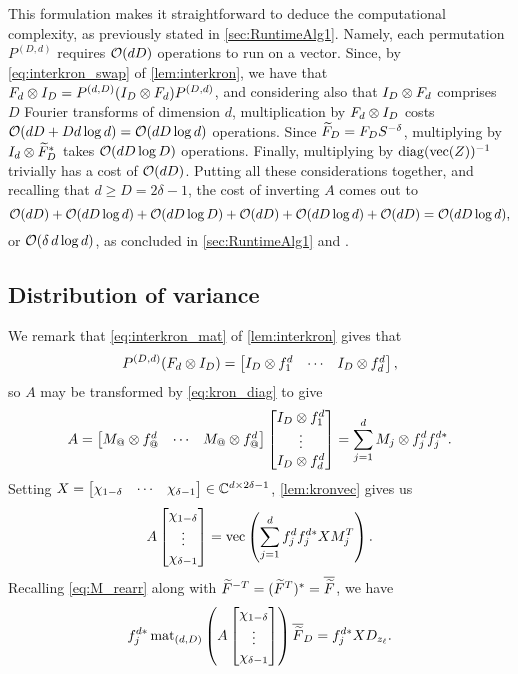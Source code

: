 This formulation makes it straightforward to deduce the computational complexity, as previously stated in \cref{sec:RuntimeAlg1}.  Namely, each permutation $P^{(D, d)}$ requires $\mathcal{O}(d D)$ operations to run on a vector.  Since, by \eqref{eq:interkron_swap} of \cref{lem:interkron}, we have that $F_d \otimes I_D = P^{(d, D)}(I_D \otimes F_d) P^{(D, d)}$, and considering also that $I_D \otimes F_d$ comprises $D$ Fourier transforms of dimension $d$, multiplication by $F_d \otimes I_D$ costs $\mathcal{O}(d D + D d \log d) = \mathcal{O}(d D \log d)$ operations.  Since $\widetilde{F}_D = F_D S^{-\delta}$, multiplying by $I_d \otimes \widetilde{F}_D^*$ takes $\mathcal{O}(d D \log D)$ operations.  Finally, multiplying by $\operatorname{diag}(\operatorname{vec}(Z))^{-1}$ trivially has a cost of $\mathcal{O}(d D)$.  Putting all these considerations together, and recalling that $d \ge D = 2 \delta - 1$, the cost of inverting $A$ comes out to \[\mathcal{O}(d D) + \mathcal{O}(d D \log d) + \mathcal{O}(d D \log D) + \mathcal{O}(d D) + \mathcal{O}(d D \log d) + \mathcal{O}(d D) = \mathcal{O}(d D \log d),\] or $\mathcal{O}(\delta\, d \log d)$, as concluded in \cref{sec:RuntimeAlg1} and \cite{IVW2015_FastPhase}.

\subsection{Distribution of variance}
We remark that \eqref{eq:interkron_mat} of \cref{lem:interkron} gives that \[P^{(D, d)} (F_d \otimes I_D) = \begin{bmatrix} I_D \otimes f^d_{1} & \cdots & I_D \otimes f^d_{d} \end{bmatrix},\] so $A$ may be transformed by \eqref{eq:kron_diag} to give \[A = \rowmatfun{M_@ \kron f_@^d}{1}{d} \colmat{I_D \kron f^d}{1}{d} = \sum_{j = 1}^d M_j \kron f_j^d f_j^{d*}.\]  Setting $X = \begin{bmatrix} \chi_{1 - \delta} & \cdots & \chi_{\delta - 1} \end{bmatrix} \in \mathbb{C}^{d \times 2 \delta - 1}$, \cref{lem:kronvec} gives us \[A \begin{bmatrix} \chi_{1 - \delta} \\ \vdots \\ \chi_{\delta - 1} \end{bmatrix} = \operatorname{vec}\left(\sum_{j = 1}^d f_j^d f_j^{d*} X M_j^T\right).\]  Recalling \eqref{eq:M_rearr} along with $\widetilde{F}^{-T} = (\widetilde{F}^T)^* = \overline{\widetilde{F}}$, we have \[f_j^{d*} \operatorname{mat}_{(d, D)}\left(A \begin{bmatrix} \chi_{1 - \delta} \\ \vdots \\ \chi_{\delta - 1} \end{bmatrix}\right) \overline{\widetilde{F}}_D = f_j^{d*} X D_{z_\ell}.\]


